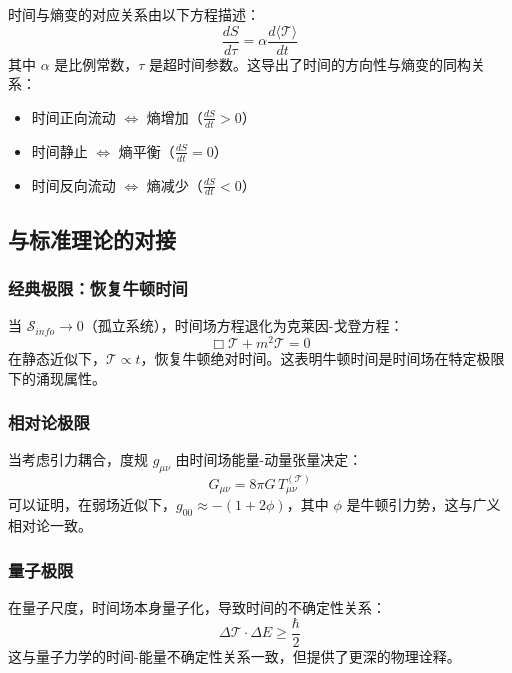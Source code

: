 \documentclass[12pt,a4paper]{article}
\begin{document}
时间与熵变的对应关系由以下方程描述：
\begin{equation}
\frac{dS}{d\tau} = \alpha \frac{d\langle \mathcal{T} \rangle}{dt}
\end{equation}
其中 $\alpha$ 是比例常数，$\tau$ 是超时间参数。这导出了时间的方向性与熵变的同构关系：
\begin{itemize}
\item 时间正向流动 $\Leftrightarrow$ 熵增加（$\frac{dS}{dt} > 0$）
\item 时间静止 $\Leftrightarrow$ 熵平衡（$\frac{dS}{dt} = 0$）
\item 时间反向流动 $\Leftrightarrow$ 熵减少（$\frac{dS}{dt} < 0$）
\end{itemize}

\subsection{与标准理论的对接}

\subsubsection{经典极限：恢复牛顿时间}

当 $\mathcal{S}_{info} \to 0$（孤立系统），时间场方程退化为克莱因-戈登方程：
\begin{equation}
\Box \mathcal{T} + m^2 \mathcal{T} = 0
\end{equation}
在静态近似下，$\mathcal{T} \propto t$，恢复牛顿绝对时间。这表明牛顿时间是时间场在特定极限下的涌现属性。

\subsubsection{相对论极限}

当考虑引力耦合，度规 $g_{\mu\nu}$ 由时间场能量-动量张量决定：
\begin{equation}
G_{\mu\nu} = 8\pi G \, T_{\mu\nu}^{(\mathcal{T})}
\end{equation}
可以证明，在弱场近似下，$g_{00} \approx -(1 + 2\phi)$，其中 $\phi$ 是牛顿引力势，这与广义相对论一致。

\subsubsection{量子极限}

在量子尺度，时间场本身量子化，导致时间的不确定性关系：
\begin{equation}
\Delta \mathcal{T} \cdot \Delta E \geq \frac{\hbar}{2}
\end{equation}
这与量子力学的时间-能量不确定性关系一致，但提供了更深的物理诠释。
\end{document}
